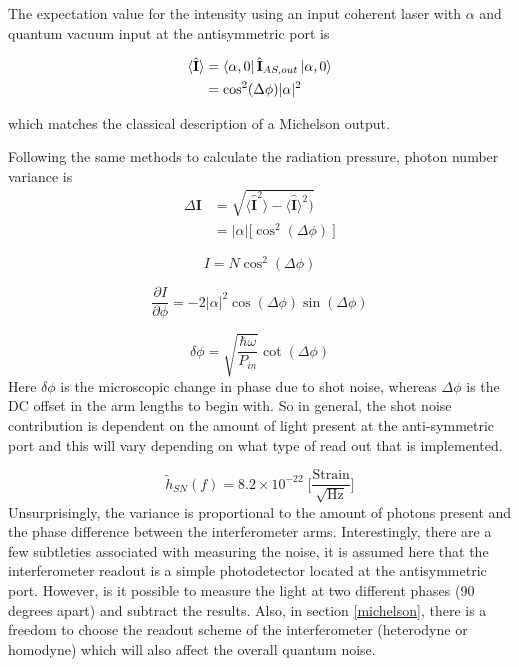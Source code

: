 		The expectation value for the intensity using an input coherent laser with $\alpha$ and quantum vacuum input at the antisymmetric port is
		
		\begin{equation}
		\begin{aligned}
		\langle \hat{\mathbf{I}} \rangle 	&= \bra{\alpha,0} \hat{\mathbf{I}}_{AS,out} \ket{\alpha,0}\\
							&= \cos^2(\Delta \phi) \vert \alpha \vert^2
		\end{aligned}
		\end{equation}
		
		which matches the classical description of a Michelson output.
		
		Following the same methods to calculate the radiation pressure, photon number variance is 
		\begin{equation} 
		\begin{aligned}
		\Delta \mathbf{I} 	&= \sqrt{\langle \mathbf{\hat{I}}^2 \rangle  - \langle \mathbf{\hat{I}} \rangle^2)} \\
							&= \vert \alpha \vert \big[ \cos^2(\Delta \phi)\ \big] 
		\end{aligned}
		\end{equation}
		
		\begin{equation}
		I = N \cos^2(\Delta \phi)
		\end{equation}
		
		\begin{equation}
		\frac{\partial I}{\partial \phi} = - 2 \vert \alpha \vert^2\cos(\Delta \phi) \sin(\Delta \phi)
		\end{equation}
		
		\begin{equation}
		\delta \phi = \sqrt{\frac{\hbar \omega}{ P_{in}}} \cot(\Delta \phi)
		\end{equation}
		Here $\delta \phi$ is the microscopic change in phase due to shot noise, whereas $\Delta\phi$ is the DC offset in the arm lengths to begin with. So in general, the shot noise contribution is dependent on the amount of light present at the anti-symmetric port and this will vary depending on what type of read out that is implemented.
		
		\begin{equation}
		\tilde{h}_{SN}(f) = 8.2\times 10^{-22} \; \bigg[ \frac{\text{Strain}}{\sqrt{\text{Hz}}}\bigg]
		\end{equation}
		Unsurprisingly, the variance is proportional to the amount of photons present and the phase difference between the interferometer arms.
		Interestingly, there are a few subtleties associated with measuring the noise, it is assumed here that the interferometer readout is a simple photodetector located at the antisymmetric port.  However, is it possible to measure the light at two different phases (90 degrees apart) and subtract the results.   Also, in section \ref{michelson}, there is a freedom to choose the readout scheme of the interferometer (heterodyne or homodyne) which will also affect the overall quantum noise.

